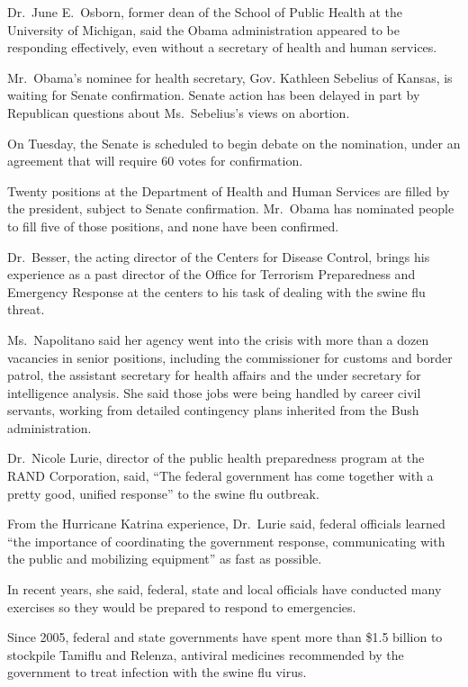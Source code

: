 \documentclass[12pt,a4paper,onecolumn]{article}
\begin{document}
Dr.~June E.~Osborn, former dean of the School of Public Health at the University of Michigan, said
the Obama administration appeared to be responding effectively, even without a secretary of health
and human services.

Mr.~Obama's nominee for health secretary, Gov. Kathleen Sebelius of Kansas, is waiting for Senate
confirmation. Senate action has been delayed in part by Republican questions about Ms.~Sebelius's
views on abortion.

On Tuesday, the Senate is scheduled to begin debate on the nomination, under an agreement that will
require 60 votes for confirmation.

Twenty positions at the Department of Health and Human Services are filled by the president, subject
to Senate confirmation. Mr.~Obama has nominated people to fill five of those positions, and none
have been confirmed.

Dr.~Besser, the acting director of the Centers for Disease Control, brings his experience as a past
director of the Office for Terrorism Preparedness and Emergency Response at the centers to his task
of dealing with the swine flu threat.

Ms.~Napolitano said her agency went into the crisis with more than a dozen vacancies in senior
positions, including the commissioner for customs and border patrol, the assistant secretary for
health affairs and the under secretary for intelligence analysis. She said those jobs were being
handled by career civil servants, working from detailed contingency plans inherited from the Bush
administration.

Dr.~Nicole Lurie, director of the public health preparedness program at the RAND Corporation, said,
``The federal government has come together with a pretty good, unified response'' to the swine flu
outbreak.

From the Hurricane Katrina experience, Dr.~Lurie said, federal officials learned ``the importance of
coordinating the government response, communicating with the public and mobilizing equipment'' as
fast as possible.

In recent years, she said, federal, state and local officials have conducted many exercises so they
would be prepared to respond to emergencies.

Since 2005, federal and state governments have spent more than \$1.5 billion to stockpile Tamiflu and
Relenza, antiviral medicines recommended by the government to treat infection with the swine flu
virus.
\end{document}
